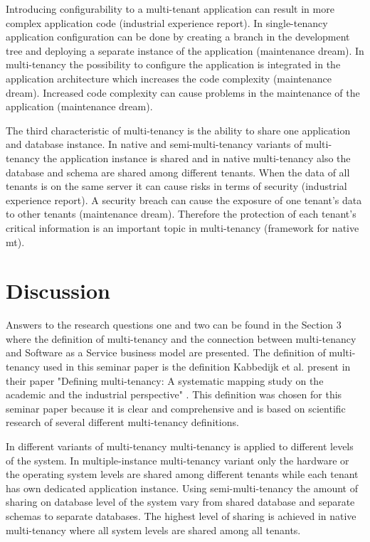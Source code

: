 \documentclass[conference]{sasmoota2017}
\begin{document}
Introducing configurability to a multi-tenant application can result in more complex application code (industrial experience report). In single-tenancy application configuration can be done by creating a branch in the development tree and deploying a separate instance of the application (maintenance dream). In multi-tenancy the possibility to configure the application is integrated in the application architecture which increases the code complexity (maintenance dream). Increased code complexity can cause problems in the maintenance of the application (maintenance dream). 

The third characteristic of multi-tenancy is the ability to share one application and database instance. In native and semi-multi-tenancy variants of multi-tenancy the application instance is shared and in native multi-tenancy also the database and schema are shared among different tenants. When the data of all tenants is on the same server it can cause risks in terms of security (industrial experience report). A security breach can cause the exposure of one tenant's data to other tenants (maintenance dream). Therefore the protection of each tenant's critical information is an important topic in multi-tenancy (framework for native mt).



\section{Discussion}

Answers to the research questions one and two can be found in the Section 3 where the definition of multi-tenancy and the connection between multi-tenancy and Software as a Service business model are presented. The definition of multi-tenancy used in this seminar paper is the definition Kabbedijk et al. present in their paper "Defining multi-tenancy: A systematic mapping study on the academic and the industrial perspective" \cite{Kabbedijk2015:Defining}. This definition was chosen for this seminar paper because it is clear and comprehensive and is based on scientific research of several different multi-tenancy definitions.

In different variants of multi-tenancy multi-tenancy is applied to different levels of the system. In multiple-instance multi-tenancy variant only the hardware or the operating system levels are shared among different tenants while each tenant has own dedicated application instance. Using semi-multi-tenancy the amount of sharing on database level of the system vary from shared database and separate schemas to separate databases. The highest level of sharing is achieved in native multi-tenancy where all system levels are shared among all tenants. 
\end{document}
